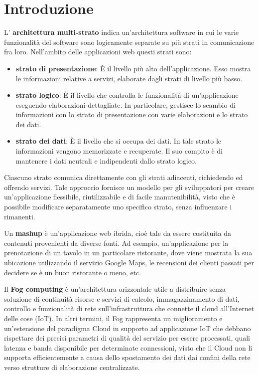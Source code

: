 \chapter{Introduzione}
L' \textbf{architettura multi-strato} indica un'architettura software in cui le varie funzionalità del software sono logicamente separate su più strati in comunicazione fra loro. Nell'ambito delle applicazioni web questi strati sono:
\begin{itemize}
    \item \textbf{strato di presentazione}: È il livello più alto dell'applicazione. Esso mostra le informazioni relative a servizi, elaborate dagli strati di livello più basso.
    \item \textbf{strato logico}: È il livello che controlla le funzionalità di un'applicazione eseguendo elaborazioni dettagliate. In particolare, gestisce lo scambio di informazioni con lo strato di presentazione con varie elaborazioni e lo strato dei dati.
    \item \textbf{strato dei dati}: È il livello che si occupa dei dati. In tale strato le informazioni vengono memorizzate e recuperate. Il suo compito è di mantenere i dati neutrali e indipendenti dallo strato logico.
\end{itemize}

Ciascuno strato comunica direttamente con gli strati adiacenti, richiedendo ed offrendo servizi.
Tale approccio fornisce un modello per gli sviluppatori per creare un'applicazione flessibile, riutilizzabile e di facile manutenibilità, visto che è possibile modificare separatamente uno specifico strato, senza influenzare i rimanenti.

Un \textbf{mashup} è un'applicazione web ibrida, cioè tale da essere costituita da contenuti provenienti da diverse fonti. Ad esempio, un'applicazione per la prenotazione di un tavolo in un particolare ristorante, dove viene mostrata la sua ubicazione utilizzando il servizio Google Maps, le recensioni dei clienti passati per decidere se è un buon ristorante o meno, etc.

Il \textbf{Fog computing} è un'architettura orizzontale utile a distribuire senza soluzione di continuità risorse e servizi di calcolo, immagazzinamento di dati, controllo e funzionalità di rete sull'infrastruttura che connette il cloud all'Internet delle cose (IoT). In altri termini, il Fog rappresenta un miglioramento e un'estensione del paradigma Cloud in supporto ad applicazione IoT che debbano rispettare dei precisi parametri di qualità del servizio per essere processati, quali latenza e banda disponibile per determinate connessioni, visto che il Cloud non li supporta efficientemente a causa dello spostamento dei dati dai confini della rete verso strutture di elaborazione centralizzate.

